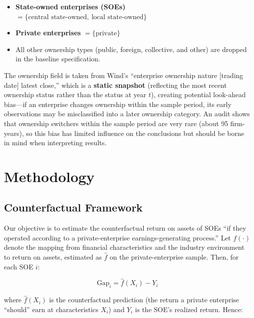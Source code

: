 \documentclass[11pt,a4paper]{article}
\begin{document}
\begin{itemize}[leftmargin=2em,itemsep=0pt]
\item \textbf{State-owned enterprises (SOEs)} $=\{\text{central state-owned},\ \text{local state-owned}\}$
\item \textbf{Private enterprises} $=\{\text{private}\}$
\item All other ownership types (public, foreign, collective, and other) are dropped in the baseline specification.
\end{itemize}

The ownership field is taken from Wind's ``enterprise ownership nature [trading date] latest close,'' which is a \textbf{static snapshot} (reflecting the most recent ownership status rather than the status at year $t$), creating potential look-ahead bias---if an enterprise changes ownership within the sample period, its early observations may be misclassified into a later ownership category. An audit shows that ownership switchers within the sample period are very rare (about 95 firm-years), so this bias has limited influence on the conclusions but should be borne in mind when interpreting results.

\section{Methodology}

\subsection{Counterfactual Framework}

Our objective is to estimate the counterfactual return on assets of SOEs ``if they operated according to a private-enterprise earnings-generating process.'' Let $f(\cdot)$ denote the mapping from financial characteristics and the industry environment to return on assets, estimated as $\hat f$ on the private-enterprise sample. Then, for each SOE $i$:

\begin{equation}
\text{Gap}_i = \hat f(X_i) - Y_i
\end{equation}

where $\hat f(X_i)$ is the counterfactual prediction (the return a private enterprise ``should'' earn at characteristics $X_i$) and $Y_i$ is the SOE's realized return. Hence:
\end{document}
